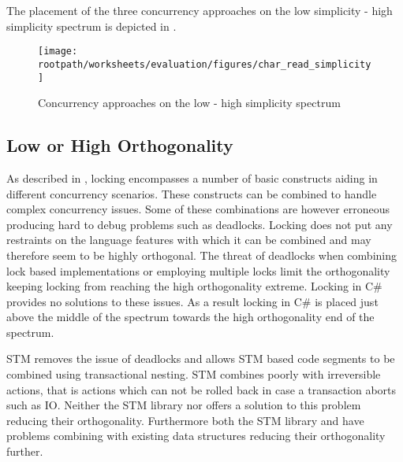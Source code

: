 The placement of the three concurrency approaches on the low simplicity - high simplicity spectrum is depicted in .

\begin{figure}[htbp]
\centering
 \texttt{[image: \\rootpath/worksheets/evaluation/figures/char\_read\_simplicity]} 
 \caption{Concurrency approaches on the low - high simplicity spectrum}
\label{fig:char_simplicity}
\end{figure}
\subsection{Low or High Orthogonality}\label{subsec:orthogonality}
As described in , locking encompasses a number of basic constructs aiding in different concurrency scenarios. These constructs can be combined to handle complex concurrency issues. Some of these combinations are however erroneous producing hard to debug problems such as deadlocks. Locking does not put any restraints on the language features with which it can be combined and may therefore seem to be highly orthogonal. The threat of deadlocks when combining lock based implementations or employing multiple locks limit the orthogonality keeping locking from reaching the high orthogonality extreme. Locking in C\# provides no solutions to these issues. As a result locking in C\# is placed just above the middle of the spectrum towards the high orthogonality end of the spectrum.

\ac{STM} removes the issue of deadlocks and allows \ac{STM} based code segments to be combined using transactional nesting. \ac{STM} combines poorly with irreversible actions, that is actions which can not be rolled back in case a transaction aborts such as \ac{IO}. Neither the \ac{STM} library nor \stmnamesp offers a solution to this problem reducing their orthogonality. Furthermore both the \ac{STM} library and \stmnamesp have problems combining with existing data structures reducing their orthogonality further.

